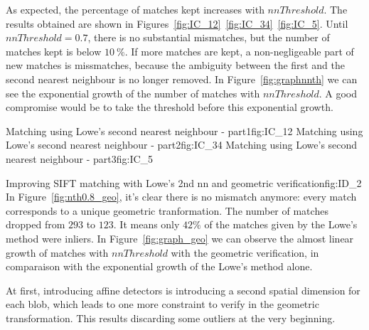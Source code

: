 \documentclass{article}
\begin{document}

As expected, the percentage of matches kept increases with \( nnThreshold\). The results obtained are shown in Figures~\ref{fig:IC_12}~\ref{fig:IC_34}~\ref{fig:IC_5}. Until \( nnThreshold = 0.7\), there is no substantial mismatches, but the number of matches kept is below \( 10~\%\). If more matches are kept, a non-negligeable part of new matches is missmatches, because the ambiguity between the first and the second nearest neighbour is no longer removed. In Figure~\ref{fig:graphnnth} we can see the exponential growth of the number of matches with \( nnThreshold \). A good compromise would be to take the threshold before this exponential growth.

{}
{Matching using Lowe's second nearest neighbour - part1}{fig:IC_12}
{}
{Matching using Lowe's second nearest neighbour - part2}{fig:IC_34}
{}
{Matching using Lowe's second nearest neighbour - part3}{fig:IC_5}




{}
{Improving SIFT matching with Lowe's 2nd nn and geometric verification}{fig:ID_2}
In Figure~\ref{fig:nth0.8_geo}, it's clear there is no mismatch anymore: every match corresponds to a unique geometric tranformation. The number of matches dropped from \( 293\) to \( 123\). It means only \( 42\%\) of the matches given by the Lowe's method were inliers. In Figure~\ref{fig:graph_geo} we can observe the almost linear growth of matches with \( nnThreshold\) with the geometric verification, in comparaison with the exponential growth of the Lowe's method alone.

At first, introducing affine detectors is introducing a second spatial dimension for each blob, which leads to one more constraint to verify in the geometric transformation. This results discarding some outliers at the very beginning.

\end{document}

